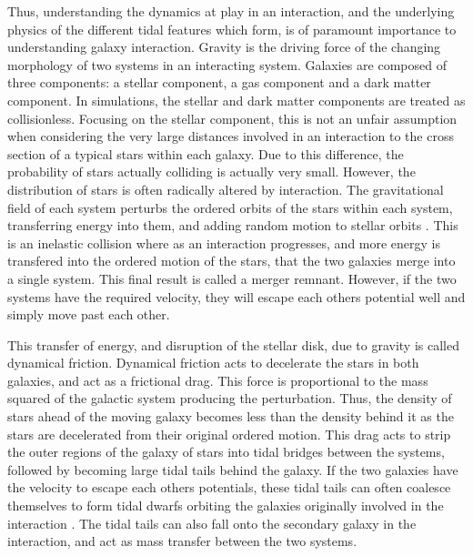 Thus, understanding the dynamics at play in an interaction, and the underlying physics of the different tidal features which form, is of paramount importance to understanding galaxy interaction. Gravity is the driving force of the changing morphology of two systems in an interacting system. Galaxies are composed of three components: a stellar component, a gas component and a dark matter component. In simulations, the stellar and dark matter components are treated as collisionless. Focusing on the stellar component, this is not an unfair assumption when considering the very large distances involved in an interaction to the cross section of a typical stars within each galaxy. Due to this difference, the probability of stars actually colliding is actually very small. However, the distribution of stars is often radically altered by interaction. The gravitational field of each system perturbs the ordered orbits of the stars within each system, transferring energy into them, and adding random motion to stellar orbits \citep{Holmberg 1941 or Alladin 1965}. This is an inelastic collision where as an interaction progresses, and more energy is transfered into the ordered motion of the stars, that the two galaxies merge into a single system. This final result is called a merger remnant. However, if the two systems have the required velocity, they will escape each others potential well and simply move past each other.

This transfer of energy, and disruption of the stellar disk, due to gravity is called dynamical friction. Dynamical friction acts to decelerate the stars in both galaxies, and act as a frictional drag. This force is proportional to the mass squared of the galactic system producing the perturbation. Thus, the density of stars ahead of the moving galaxy becomes less than the density behind it as the stars are decelerated from their original ordered motion. This drag acts to strip the outer regions of the galaxy of stars into tidal bridges between the systems, followed by becoming large tidal tails behind the galaxy. If the two galaxies have the velocity to escape each others potentials, these tidal tails can often coalesce themselves to form tidal dwarfs orbiting the galaxies originally involved in the interaction \citep{Paper about tidal dwarfs}. The tidal tails can also fall onto the secondary galaxy in the interaction, and act as mass transfer between the two systems.


